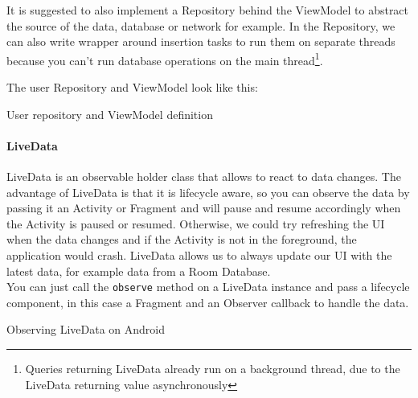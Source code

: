 \documentclass[twoside, openright,11pt,a4paper]{book}
\newenvironment{code}{\captionsetup{type=listing}}{}
\begin{document}
It is suggested to also implement a Repository behind the ViewModel to abstract the source of the data, database or network for example. In the Repository, we can also write wrapper around insertion tasks to run them on separate threads because you can't run database operations on the main thread\footnote{Queries returning LiveData already run on a background thread, due to the LiveData returning value asynchronously}.

The user Repository and ViewModel look like this:
\begin{code}
\caption{User repository and ViewModel definition} 	
\end{code}


\paragraph{LiveData}
\label{livedata}
LiveData\cite{android:doc:jetpack:livedata} is an observable holder class that allows to react to data changes. The advantage of LiveData is that it is lifecycle aware, so you can observe the data by passing it an Activity or Fragment and will pause and resume accordingly when the Activity is paused or resumed. Otherwise, we could try refreshing the UI when the data changes and if the Activity is not in the foreground, the application would crash. LiveData allows us to always update our UI with the latest data, for example data from a Room Database.\\

You can just call the \verb+observe+ method on a LiveData instance and pass a lifecycle component, in this case a Fragment and an Observer callback to handle the data.
\begin{code}
\caption{Observing LiveData on Android}	
\end{code}
\end{document}
